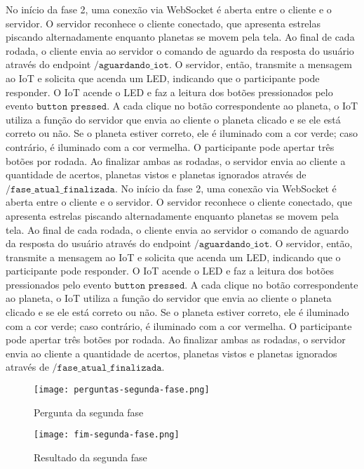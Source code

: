 No início da fase 2, uma conexão via WebSocket é aberta entre o cliente e o servidor. O servidor reconhece o cliente conectado, que apresenta estrelas piscando alternadamente enquanto planetas se movem pela tela. Ao final de cada rodada, o cliente envia ao servidor o comando de aguardo da resposta do usuário através do endpoint $\texttt{/aguardando\_iot}$. O servidor, então, transmite a mensagem ao IoT e solicita que acenda um LED, indicando que o participante pode responder. O IoT acende o LED e faz a leitura dos botões pressionados pelo evento $\texttt{button pressed}$. A cada clique no botão correspondente ao planeta, o IoT utiliza a função do servidor que envia ao cliente o planeta clicado e se ele está correto ou não. Se o planeta estiver correto, ele é iluminado com a cor verde; caso contrário, é iluminado com a cor vermelha. O participante pode apertar três botões por rodada. Ao finalizar ambas as rodadas, o servidor envia ao cliente a quantidade de acertos, planetas vistos e planetas ignorados através de $\texttt{/fase\_atual\_finalizada}$.
 No início da fase 2, uma conexão via WebSocket é aberta entre o cliente e o servidor. O servidor reconhece o cliente conectado, que apresenta estrelas piscando alternadamente enquanto planetas se movem pela tela. Ao final de cada rodada, o cliente envia ao servidor o comando de aguardo da resposta do usuário através do endpoint $\texttt{/aguardando\_iot}$. O servidor, então, transmite a mensagem ao IoT e solicita que acenda um LED, indicando que o participante pode responder. O IoT acende o LED e faz a leitura dos botões pressionados pelo evento $\texttt{button pressed}$. A cada clique no botão correspondente ao planeta, o IoT utiliza a função do servidor que envia ao cliente o planeta clicado e se ele está correto ou não. Se o planeta estiver correto, ele é iluminado com a cor verde; caso contrário, é iluminado com a cor vermelha. O participante pode apertar três botões por rodada. Ao finalizar ambas as rodadas, o servidor envia ao cliente a quantidade de acertos, planetas vistos e planetas ignorados através de $\texttt{/fase\_atual\_finalizada}$.

\begin{figure}[H]
    \centering
    \caption{Pergunta da segunda fase}%
    \label{fig:perguntas-segunda-fase}
    \texttt{[image: perguntas-segunda-fase.png]}%
\end{figure}

\begin{figure}[H]
    \centering
    \caption{Resultado da segunda fase}%
    \label{fig:fim-segunda-fase}
    \texttt{[image: fim-segunda-fase.png]}%
\end{figure}

